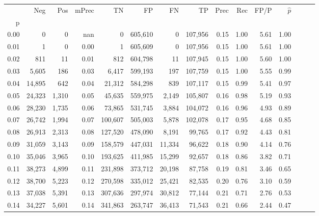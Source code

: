 \begin{tabular}{rrrrrrrrrrrrrrr}
\toprule
{} &     Neg &    Pos & mPrec &       TN &       FP &       FN &       TP &  Prec &   Rec &  FP/P & $\hat{p}$ \\
p    &         &        &       &          &          &          &          &       &       &       &           \\
\midrule
0.00 &       0 &      0 &   nan &        0 &  605,610 &        0 &  107,956 &  0.15 &  1.00 &  5.61 &      1.00 \\
0.01 &       1 &      0 &  0.00 &        1 &  605,609 &        0 &  107,956 &  0.15 &  1.00 &  5.61 &      1.00 \\
0.02 &     811 &     11 &  0.01 &      812 &  604,798 &       11 &  107,945 &  0.15 &  1.00 &  5.60 &      1.00 \\
0.03 &   5,605 &    186 &  0.03 &    6,417 &  599,193 &      197 &  107,759 &  0.15 &  1.00 &  5.55 &      0.99 \\
0.04 &  14,895 &    642 &  0.04 &   21,312 &  584,298 &      839 &  107,117 &  0.15 &  0.99 &  5.41 &      0.97 \\
0.05 &  24,323 &  1,310 &  0.05 &   45,635 &  559,975 &    2,149 &  105,807 &  0.16 &  0.98 &  5.19 &      0.93 \\
0.06 &  28,230 &  1,735 &  0.06 &   73,865 &  531,745 &    3,884 &  104,072 &  0.16 &  0.96 &  4.93 &      0.89 \\
0.07 &  26,742 &  1,994 &  0.07 &  100,607 &  505,003 &    5,878 &  102,078 &  0.17 &  0.95 &  4.68 &      0.85 \\
0.08 &  26,913 &  2,313 &  0.08 &  127,520 &  478,090 &    8,191 &   99,765 &  0.17 &  0.92 &  4.43 &      0.81 \\
0.09 &  31,059 &  3,143 &  0.09 &  158,579 &  447,031 &   11,334 &   96,622 &  0.18 &  0.90 &  4.14 &      0.76 \\
0.10 &  35,046 &  3,965 &  0.10 &  193,625 &  411,985 &   15,299 &   92,657 &  0.18 &  0.86 &  3.82 &      0.71 \\
0.11 &  38,273 &  4,899 &  0.11 &  231,898 &  373,712 &   20,198 &   87,758 &  0.19 &  0.81 &  3.46 &      0.65 \\
0.12 &  38,700 &  5,223 &  0.12 &  270,598 &  335,012 &   25,421 &   82,535 &  0.20 &  0.76 &  3.10 &      0.59 \\
0.13 &  37,038 &  5,391 &  0.13 &  307,636 &  297,974 &   30,812 &   77,144 &  0.21 &  0.71 &  2.76 &      0.53 \\
0.14 &  34,227 &  5,601 &  0.14 &  341,863 &  263,747 &   36,413 &   71,543 &  0.21 &  0.66 &  2.44 &      0.47 \\

\end{tabular}
